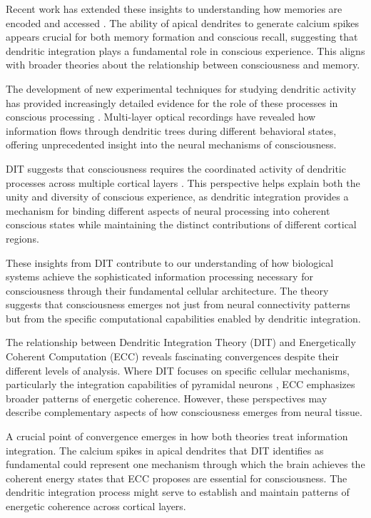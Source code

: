 Recent work has extended these insights to understanding how memories are encoded and accessed \cite{Shin2021}. The ability of apical dendrites to generate calcium spikes appears crucial for both memory formation and conscious recall, suggesting that dendritic integration plays a fundamental role in conscious experience. This aligns with broader theories about the relationship between consciousness and memory.

The development of new experimental techniques for studying dendritic activity has provided increasingly detailed evidence for the role of these processes in conscious processing \cite{Suzuki2021}. Multi-layer optical recordings have revealed how information flows through dendritic trees during different behavioral states, offering unprecedented insight into the neural mechanisms of consciousness.

DIT suggests that consciousness requires the coordinated activity of dendritic processes across multiple cortical layers \cite{Aru2019}. This perspective helps explain both the unity and diversity of conscious experience, as dendritic integration provides a mechanism for binding different aspects of neural processing into coherent conscious states while maintaining the distinct contributions of different cortical regions.

These insights from DIT contribute to our understanding of how biological systems achieve the sophisticated information processing necessary for consciousness through their fundamental cellular architecture. The theory suggests that consciousness emerges not just from neural connectivity patterns but from the specific computational capabilities enabled by dendritic integration.

The relationship between Dendritic Integration Theory (DIT) and Energetically Coherent Computation (ECC) reveals fascinating convergences despite their different levels of analysis. Where DIT focuses on specific cellular mechanisms, particularly the integration capabilities of pyramidal neurons \cite{Larkum2009}, ECC emphasizes broader patterns of energetic coherence. However, these perspectives may describe complementary aspects of how consciousness emerges from neural tissue.

A crucial point of convergence emerges in how both theories treat information integration. The calcium spikes in apical dendrites that DIT identifies as fundamental \cite{Major2013} could represent one mechanism through which the brain achieves the coherent energy states that ECC proposes are essential for consciousness. The dendritic integration process might serve to establish and maintain patterns of energetic coherence across cortical layers.

